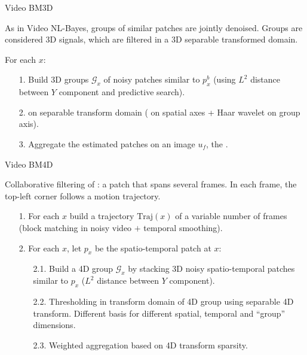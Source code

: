 \documentclass[mathserif]{beamer}
\makeatletter
\newcounter{multipleslide}
\newcommand{\multipleframe}{%
\setcounter{multipleslide}{\value{framenumber}}
\stepcounter{multipleslide}
\patchcmd{\beamer@@tmpl@footline}%
	{\insertframenumber}%
	{\themultipleslide}%
	{}%
	{}%
}
\newcommand{\restoreframe}{%
\patchcmd{\beamer@@tmpl@footline}%
	{\themultipleslide}%
	{\insertframenumber}%
	{}%
	{}%
\setcounter{framenumber}{\value{multipleslide}}%
}
\makeatother
\begin{document}
\begin{frame}{Video BM3D}

	As in Video NL-Bayes, groups of similar patches are jointly denoised. Groups
	are considered 3D signals, which are filtered in a 3D separable transformed
	domain.
	
	\vspace{.7cm}
	
	 For each $x$:

	\begin{enumerate}\itemsep=.5cm
		\item[1.] Build 3D groups $\mathcal G_x$ of noisy patches  similar to $p^b_x$ (using $L^2$ distance between $Y$
			component  and predictive search).
	
		\item[2.]  on separable transform domain ( on spatial
			axes + Haar wavelet on group axis). 

		\item[3.] Aggregate the estimated patches on an image $u_f$, the
			.

	\end{enumerate}
	
\end{frame}
\restoreframe


\multipleframe
\begin{frame}{Video BM4D}

	Collaborative filtering of : a patch
	that spans several frames. In each frame, the top-left corner follows a
	motion trajectory.


	\vspace{.6cm}
	
	\begin{enumerate} \itemsep=.5cm
		\item[1.] For each $x$ build a trajectory $\text{Traj}(x)$ of a variable
			number of frames (block matching in noisy video $+$ temporal smoothing).
		\item[2.] For each $x$, let $p_x$ be the spatio-temporal patch at $x$:
			\begin{enumerate} \itemsep=.2cm
				\item[2.1.] Build a 4D group $\mathcal G_x$ by stacking 3D noisy
					spatio-temporal patches similar to $p_x$ ($L^2$ distance between
					$Y$ component).
				\item[2.2.] Thresholding in transform domain of 4D group
					using separable 4D transform. Different basis for different
					spatial, temporal and ``group'' dimensions.
				\item[2.3.] Weighted aggregation based on 4D transform sparsity.
			\end{enumerate}
	\end{enumerate}

\end{frame}
\end{document}
